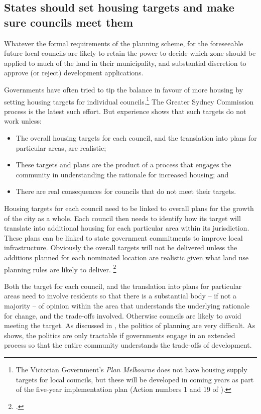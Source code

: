 \subsection{States should set housing targets and make sure councils meet them}\label{subsec:state-governments-need-to-set-and-make-councils-meet-future-housing-targets}

Whatever the formal requirements of the planning scheme, for the foreseeable future local councils are likely to retain the power to decide which zone should be applied to much of the land in their municipality, and substantial discretion to approve (or reject) development applications.

Governments have often tried to tip the balance in favour of more housing by setting housing targets for individual councils.\footnote{The Victorian Government's \emph{Plan Melbourne} does not have housing supply targets for local councils, but these will be developed in coming years as part of the five-year implementation plan (Action numbers 1 and 19 of \textcite{VicGov2017PlanMelb}).}
The Greater Sydney Commission process is the latest such effort.
But experience shows that such targets do not work unless:

\begin{itemize}
\item
The overall housing targets for each council, and the translation into plans for particular areas, are realistic;
\item
These targets and plans are the product of a process that engages the community in understanding the rationale for increased housing; and
\item
There are real consequences for councils that do not meet their targets.
\end{itemize}

Housing targets for each council need to be linked to overall plans for the growth of the city as a whole.
Each council then needs to identify how its target will translate into additional housing for each particular area within its jurisdiction.
These plans can be linked to state government commitments to improve local infrastructure.
Obviously the overall targets will not be delivered unless the additions planned for each nominated location are realistic given what land use planning rules are likely to deliver.%
	\footcites[][10]{BuxtonEtAl2015}{Property-Council-2015-Missing-the-mark}

Both the target for each council, and the translation into plans for particular areas need to involve residents so that there is a substantial body -- if not a majority -- of opinion within the area that understands the underlying rationale for change, and the trade-offs involved.
Otherwise councils are likely to avoid meeting the target.
As discussed in , the politics of planning are very difficult.
As  shows, the politics are only tractable if governments engage in an extended process so that the entire community understands the trade-offs of development.

